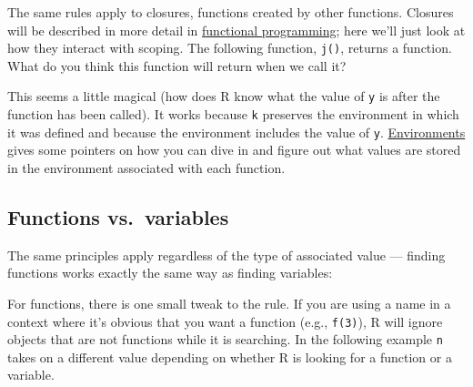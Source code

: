The same rules apply to closures, functions created by other functions.
Closures will be described in more detail in
\hyperref[functional-programming]{functional programming}; here we'll
just look at how they interact with scoping. The following function,
\texttt{j()}, returns a function. What do you think this function will
return when we call it? 

\begin{Shaded}
\begin{Highlighting}[]
\StringTok{ }
  \StringTok{ }
  \NormalTok{\}}
\NormalTok{\}}
\StringTok{ }\NormalTok{(}\NormalTok{)}
\NormalTok{()}
\end{Highlighting}
\end{Shaded}

This seems a little magical (how does R know what the value of
\texttt{y} is after the function has been called). It works because
\texttt{k} preserves the environment in which it was defined and because
the environment includes the value of \texttt{y}.
\hyperref[environments]{Environments} gives some pointers on how you can
dive in and figure out what values are stored in the environment
associated with each function.

\subsection{Functions vs.~variables}

The same principles apply regardless of the type of associated value ---
finding functions works exactly the same way as finding variables:

\begin{Shaded}
\begin{Highlighting}[]
\StringTok{ }\StringTok{ }
\StringTok{ }
  \StringTok{ }\StringTok{ }
  \NormalTok{(}\NormalTok{)}
\NormalTok{\}}
\NormalTok{()}
\end{Highlighting}
\end{Shaded}

For functions, there is one small tweak to the rule. If you are using a
name in a context where it's obvious that you want a function (e.g.,
\texttt{f(3)}), R will ignore objects that are not functions while it is
searching. In the following example \texttt{n} takes on a different
value depending on whether R is looking for a function or a variable.

